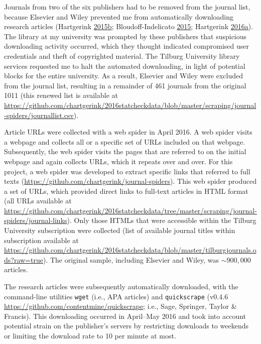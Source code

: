 \documentclass[a5paper]{book}
\begin{document}
Journals from two of the six publishers had to be removed from the
journal list, because Elsevier and Wiley prevented me from automatically
downloading research articles (Hartgerink
\protect\hyperlink{ref-ons-elsevier}{2015}\protect\hyperlink{ref-ons-elsevier}{b};
Bloudoff-Indelicato
\protect\hyperlink{ref-doi:10.1038ux2f527413f}{2015}; Hartgerink
\protect\hyperlink{ref-ons-wiley}{2016}\protect\hyperlink{ref-ons-wiley}{a}).
The library at my university was prompted by these publishers that
suspicious downloading activity occurred, which they thought indicated
compromised user credentials and theft of copyrighted material. The
Tilburg University library services requested me to halt the automated
downloading, in light of potential blocks for the entire university. As
a result, Elsevier and Wiley were excluded from the journal list,
resulting in a remainder of 461 journals from the original 1011 (this
renewed list is available at
\url{https://github.com/chartgerink/2016statcheckdata/blob/master/scraping/journal-spiders/journallist.csv}).

Article URLs were collected with a web spider in April 2016. A web
spider visits a webpage and collects all or a specific set of URLs
included on that webpage. Subsequently, the web spider visits the pages
that are referred to on the initial webpage and again collects URLs,
which it repeats over and over. For this project, a web spider was
developed to extract specific links that referred to full texts
(\url{https://github.com/chartgerink/journal-spiders}). This web spider
produced a set of URLs, which provided direct links to full-text
articles in HTML format (all URLs available at
\url{https://github.com/chartgerink/2016statcheckdata/tree/master/scraping/journal-spiders/journal-links}).
Only those HTMLs that were accessible within the Tilburg University
subscription were collected (list of available journal titles within
subscription available at
\url{https://github.com/chartgerink/2016statcheckdata/blob/master/tilburgjournals.ods?raw=true}).
The original sample, including Elsevier and Wiley, was \(\sim900,000\)
articles.

The research articles were subsequently automatically downloaded, with
the command-line utilities \texttt{wget} (i.e., APA articles) and
\texttt{quickscrape} (v0.4.6
\url{https://github.com/contentmine/quickscrape}; i.e., Sage, Springer,
Taylor \& Francis). This downloading occurred in April--May 2016 and
took into account potential strain on the publisher's servers by
restricting downloads to weekends or limiting the download rate to 10
per minute at most.
\end{document}
